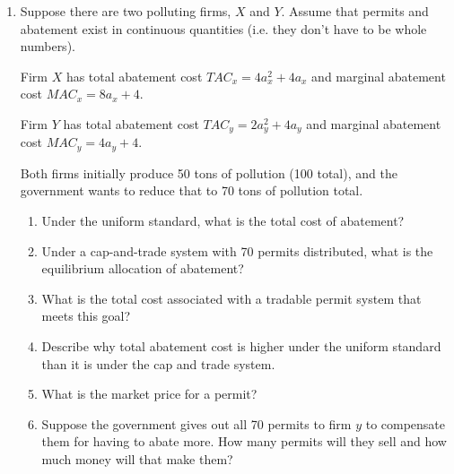 \documentclass[11pt]{article}
\newcommand{\answer}[1]{\iftoggle{INCLUDEANSWERS}{{\color{violet!70!white}\textbf{Solution:} #1}}{}}
\newcommand{\points}[1]{\iftoggle{INCLUDEPOINTS}{{\color{blue!70!white}(#1 pts.)}}{}}
\begin{document}
\begin{enumerate}
\begin{enumerate}
  \end{enumerate}


  \item Suppose there are two polluting firms, $X$ and $Y$. Assume that permits and abatement exist in continuous quantities (i.e. they don’t have to be whole numbers).

  Firm $X$ has total abatement cost $TAC_x = 4a_x^2 + 4a_x$ and marginal abatement cost $MAC_x = 8a_x + 4$. 

  Firm $Y$ has total abatement cost $TAC_y = 2a_y^2 + 4a_y$ and marginal abatement cost $MAC_y = 4a_y + 4$.
  
  Both firms initially produce 50 tons of pollution (100 total), and the government wants to reduce that to 70 tons of pollution total. 

  \begin{enumerate}
    \item \points{5} Under the uniform standard, what is the total cost of abatement?
    \item \points{10} Under a cap-and-trade system with 70 permits distributed, what is the equilibrium allocation of abatement?
    \item \points{5} What is the total cost associated with a tradable permit system that meets this goal?
    \item \points{10} Describe why total abatement cost is higher under the uniform standard than it is under the cap and trade system.
    \item \points{5} What is the market price for a permit?
    \item \points{5} Suppose the government gives out all 70 permits to firm $y$ to compensate them for having to abate more. How many permits will they sell and how much money will that make them?
  \end{enumerate}

  \answer{
    \begin{enumerate}
      \item $a_x = a_y = 15$ under the uniform standard.
      $$
        TAC = TAC_x + TAC_y = (4 * 15^2 + 4 * 15) + (2 * 15^2 + 4 * 15) = 960 + 510 = 1,470
      $$
      
      \item The optimality condition is $8a_x + 4 = 4a_y + 4$ which simplifies to $2a_x = a_y$. Plugging that into our constraint $a_x + a_y = 30$ yields:
      $$
        a_x + 2 a_x = 30 \implies a_x^* = 10
      $$
      and $a_y^* = 20$.

      $a_x^* = 10$ and $a_y^* = 20$.


\end{enumerate}}
\end{enumerate}
\end{document}
